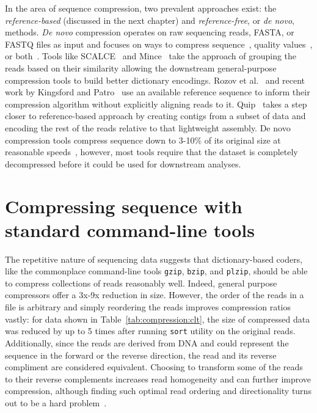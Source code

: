 \documentclass[12pt]{cmuthesis}
\makeatletter
\newcommand{\etal}{et al.\@\xspace}
\makeatother
\begin{document}
In the area of sequence compression, two prevalent approaches exist: the \textit{reference-based} (discussed in the next chapter) and \textit{reference-free}, or \textit{de novo}, methods. \textit{De novo} compression operates on raw sequencing reads, FASTA, or FASTQ files as input and focuses on ways to compress sequence~\cite{Mince,PathEncode,Rozov2014}, quality values~\cite{SeqSqueeze,KmerQuals,JaninQuals}, or both~\cite{GSQZ,Sahinalp2012}. Tools like SCALCE~\cite{Sahinalp2012} and Mince~\cite{Mince} take the approach of grouping the reads based on their similarity allowing the downstream general-purpose compression tools to build better dictionary encodings. Rozov \etal~\cite{Rozov2014} and recent work by Kingsford and Patro~\cite{PathEncode} use an available reference sequence to inform their compression algorithm without explicitly aligning reads to it. Quip~\cite{Jones2012} takes a step closer to reference-based approach by creating contigs from a subset of data and encoding the rest of the reads relative to that lightweight assembly. De novo compression tools compress sequence down to 3-10\% of its original size at reasonable speeds~\cite{Deorowicz2013}, however, most tools require that the dataset is completely decompressed before it could be used for downstream analyses.


\section{Compressing sequence with standard command-line tools}

  The repetitive nature of sequencing data suggests that dictionary-based coders, like the commonplace command-line tools \texttt{gzip}, \texttt{bzip}, and \texttt{plzip}, should be able to compress collections of reads reasonably well. Indeed, general purpose compressors offer a 3x-9x reduction in size. However, the order of the reads in a file is arbitrary and simply reordering the reads improves compression ratios vastly: for data shown in Table~\ref{tab:compression:clt}, the size of compressed data was reduced by up to 5 times after running \texttt{sort} utility on the original reads. Additionally, since the reads are derived from DNA and could represent the sequence in the forward or the reverse direction, the read and its reverse compliment are considered equivalent. Choosing to transform some of the reads to their reverse complements increases read homogeneity and can further improve compression, although finding such optimal read ordering and directionality turns out to be a hard problem~\cite{PatroLCPRC}.
\end{document}
